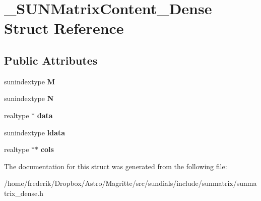 \hypertarget{struct__SUNMatrixContent__Dense}{}\section{\+\_\+\+S\+U\+N\+Matrix\+Content\+\_\+\+Dense Struct Reference}
\label{struct__SUNMatrixContent__Dense}
\subsection*{Public Attributes}
\begin{DoxyCompactItemize}
\item 
\mbox{\label{struct__SUNMatrixContent__Dense_a90bca49275e7586653c44e55d32bdca8}} 
sunindextype {\bfseries M}
\item 
\mbox{\label{struct__SUNMatrixContent__Dense_a9040d25e4cfbd0f821776489b897354c}} 
sunindextype {\bfseries N}
\item 
\mbox{\label{struct__SUNMatrixContent__Dense_ab5641580af007878b7944b277618ab6e}} 
realtype $\ast$ {\bfseries data}
\item 
\mbox{\label{struct__SUNMatrixContent__Dense_a9f14b09a5a435e506a97c08581bd12bc}} 
sunindextype {\bfseries ldata}
\item 
\mbox{\label{struct__SUNMatrixContent__Dense_a1e48e41839133963de0d12925c818015}} 
realtype $\ast$$\ast$ {\bfseries cols}
\end{DoxyCompactItemize}


The documentation for this struct was generated from the following file\+:\begin{DoxyCompactItemize}
\item 
/home/frederik/\+Dropbox/\+Astro/\+Magritte/src/sundials/include/sunmatrix/sunmatrix\+\_\+dense.\+h\end{DoxyCompactItemize}
